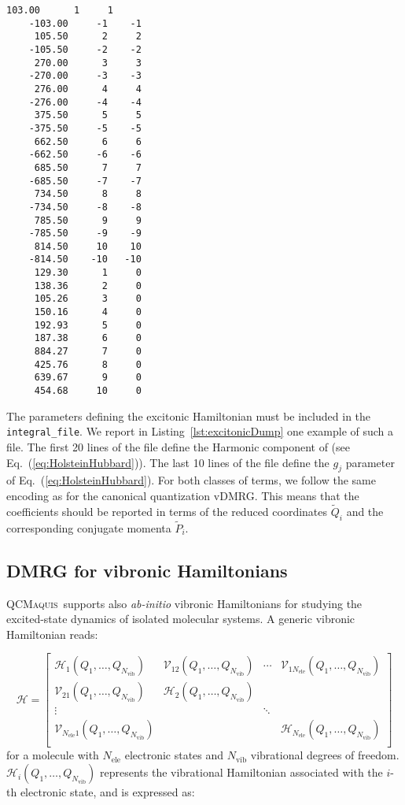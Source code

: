 \documentclass[bibliography=totoc,12pt,a4paper]{scrartcl}
\newcommand{\qcm}{\textsc{QCMaquis}}
\begin{document}
\begin{lstlisting}[language=qcmaquis,caption={Excitonic integral file format.},
				   label=lst:excitonicDump]
	 103.00      1     1
	-103.00     -1    -1
	 105.50      2     2
	-105.50     -2    -2
	 270.00      3     3
	-270.00     -3    -3
	 276.00      4     4
	-276.00     -4    -4
	 375.50      5     5
	-375.50     -5    -5
	 662.50      6     6
	-662.50     -6    -6
	 685.50      7     7
	-685.50     -7    -7
	 734.50      8     8
	-734.50     -8    -8
	 785.50      9     9
	-785.50     -9    -9
	 814.50     10    10
	-814.50    -10   -10
	 129.30      1     0
	 138.36      2     0
	 105.26      3     0
	 150.16      4     0
	 192.93      5     0
	 187.38      6     0
	 884.27      7     0
	 425.76      8     0
	 639.67      9     0
	 454.68     10     0
\end{lstlisting}

The parameters defining the excitonic Hamiltonian must be included in the \texttt{integral\_file}.
We report in Listing~\ref{lst:excitonicDump} one example of such a file.
The first 20 lines of the file define the Harmonic component of (see Eq.~(\ref{eq:HolsteinHubbard})).
The last 10 lines of the file define the $g_j$ parameter of Eq.~(\ref{eq:HolsteinHubbard}).
For both classes of terms, we follow the same encoding as for the canonical quantization vDMRG.
This means that the coefficients should be reported in terms of the reduced coordinates $\tilde{Q}_i$ and the corresponding conjugate momenta $\tilde{P}_i$.

\subsection{DMRG for vibronic Hamiltonians}
\label{sec:vibronic}

\qcm\ supports also \textit{ab-initio} vibronic Hamiltonians for studying the excited-state dynamics of isolated molecular systems.
A generic vibronic Hamiltonian reads:

\begin{equation}
  \mathcal{H} =
    \begin{bmatrix}
	   \mathcal{H}_1(Q_1,\ldots,Q_{N_\text{vib}})
	     & \mathcal{V}_{12}(Q_1,\ldots,Q_{N_\text{vib}}) 
         & \cdots 
		 & \mathcal{V}_{1 N_\text{ele}}(Q_1,\ldots,Q_{N_\text{vib}}) \\
	   \mathcal{V}_{21}(Q_1,\ldots,Q_{N_\text{vib}})
	     & \mathcal{H}_2(Q_1,\ldots,Q_{N_\text{vib}})
         &  
		 & \\
	  \vdots
	     & 
         & \ddots 
		 & \\
	  \mathcal{V}_{N_\text{ele} 1}(Q_1,\ldots,Q_{N_\text{vib}})
	     &
         &  
		 & \mathcal{H}_{N_\text{ele}}(Q_1,\ldots,Q_{N_\text{vib}}) \\
   \end{bmatrix}
  \label{eq:VibronicHamiltonian}
\end{equation}
%
for a molecule with $N_\text{ele}$ electronic states and $N_\text{vib}$ vibrational degrees of freedom.
$\mathcal{H}_{i}(Q_1,\ldots,Q_{N_\text{vib}})$ represents the vibrational Hamiltonian associated with the $i$-th electronic state, and is expressed as:
\end{document}

